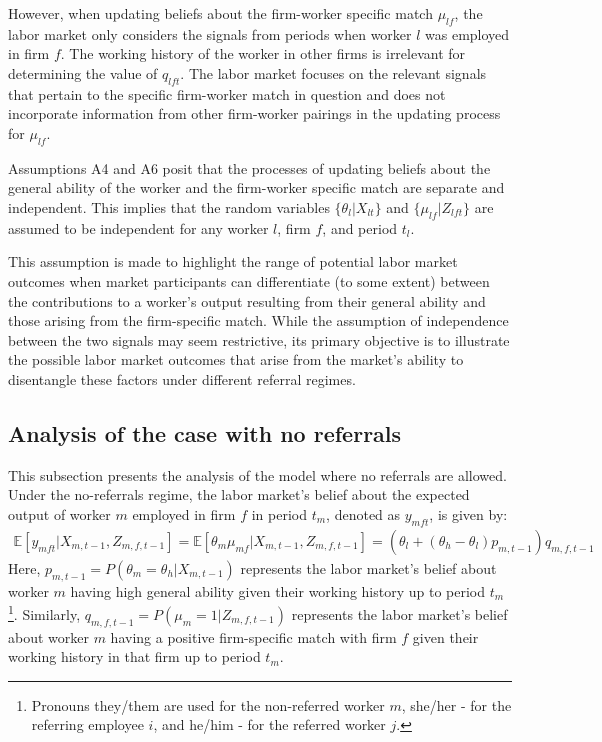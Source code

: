 \documentclass[12pt]{article}
\begin{document}
However, when updating beliefs about the firm-worker specific match $\mu_{lf}$, the labor market only considers the signals from periods when worker $l$ was employed in firm $f$. The working history of the worker in other firms is irrelevant for determining the value of $q_{lft}$. The labor market focuses on the relevant signals that pertain to the specific firm-worker match in question and does not incorporate information from other firm-worker pairings in the updating process for $\mu_{lf}$.

Assumptions A4 and A6 posit that the processes of updating beliefs about the general ability of the worker and the firm-worker specific match are separate and independent. This implies that the random variables $\{\theta_l | X_{lt}\}$ and $\{\mu_{lf} | Z_{lft}\}$ are assumed to be independent for any worker $l$, firm $f$, and period $t_l$.

This assumption is made to highlight the range of potential labor market outcomes when market participants can differentiate (to some extent) between the contributions to a worker's output resulting from their general ability and those arising from the firm-specific match. While the assumption of independence between the two signals may seem restrictive, its primary objective is to illustrate the possible labor market outcomes that arise from the market's ability to disentangle these factors under different referral regimes.


\subsection{Analysis of the case with no referrals}
This subsection presents the analysis of the model where no referrals are allowed. Under the no-referrals regime, the labor market's belief about the expected output of worker $m$ employed in firm $f$ in period $t_m$, denoted as $y_{mft}$, is given by:
\begin{multline}\label{eq:exp_output_NR}
\mathbb{E}[y_{mft} | X_{m,t-1}, Z_{m,f,t-1}] = \mathbb{E}[\theta_m \mu_{mf}| X_{m,t-1}, Z_{m,f,t-1}] 
= \left(\theta_l + (\theta_h - \theta_l)p_{m,t-1}\right) q_{m,f,t-1}
\end{multline}
Here, $p_{m,t-1} = P(\theta_m = \theta_h | X_{m,t-1} )$ represents the labor market's belief about worker $m$ having high general ability given their working history up to period $t_m$\footnote{Pronouns they/them are used for the non-referred worker $m$, she/her - for the referring employee $i$, and he/him - for the referred worker $j$.}. Similarly, $q_{m,f,t-1} = P(\mu_m = 1 | Z_{m,f,t-1} )$ represents the labor market's belief about worker $m$ having a positive firm-specific match with firm $f$ given their working history in that firm up to period $t_m$.
\end{document}

